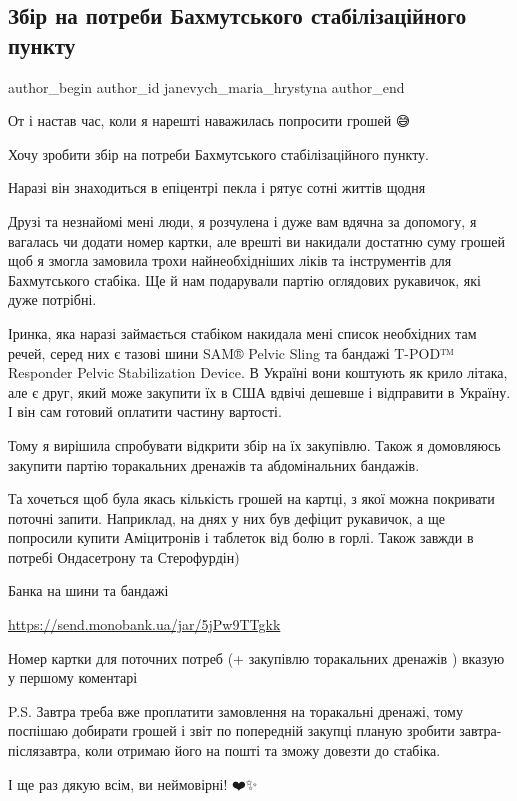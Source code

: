  
 
 
 
 

\subsection{Збір на потреби Бахмутського стабілізаційного пункту}
\label{sec:11_01_2023.fb.janevych_maria_hrystyna.1.zb_r_na_potrebi_bakh}

\ifcmt
 author_begin
   author_id janevych_maria_hrystyna
 author_end
\fi

От і настав час, коли я нарешті наважилась попросити грошей 😅

Хочу зробити збір на потреби Бахмутського стабілізаційного пункту.

Наразі він знаходиться в епіцентрі пекла і рятує сотні життів щодня

Друзі та незнайомі мені люди, я розчулена і дуже вам вдячна за допомогу, я
вагалась чи додати номер картки, але врешті ви накидали достатню суму грошей
щоб я змогла замовила трохи найнеобхідніших ліків та інструментів для
Бахмутського стабіка. Ще й нам подарували партію оглядових рукавичок, які дуже
потрібні.

Іринка, яка наразі займається стабіком накидала мені список необхідних там
речей, серед них є тазові шини SAM® Pelvic Sling та бандажі T-POD™ Responder
Pelvic Stabilization Device. В Україні вони коштують як крило літака, але є
друг, який може закупити їх в США вдвічі дешевше і відправити в Україну. І він
сам готовий оплатити частину вартості.

Тому я вирішила спробувати відкрити збір на їх закупівлю. Також я домовляюсь
закупити партію торакальних дренажів та абдомінальних бандажів.

Та хочеться щоб була якась кількість грошей на картці, з якої можна покривати
поточні запити. Наприклад, на днях у них був дефіцит рукавичок, а ще попросили
купити Аміцитронів і таблеток від болю в горлі. Також завжди в потребі
Ондасетрону та Стерофурдін)

Банка на шини та бандажі 

\url{https://send.monobank.ua/jar/5jPw9TTgkk}

Номер картки для поточних потреб (+ закупівлю торакальних дренажів ) вказую у
першому коментарі  🙂

P.S. Завтра треба вже проплатити замовлення на торакальні дренажі, тому
поспішаю добирати грошей і звіт по попередній закупці планую зробити
завтра-післязавтра, коли отримаю його на пошті та зможу довезти до стабіка.

І ще раз дякую всім, ви неймовірні! ❤️✨
